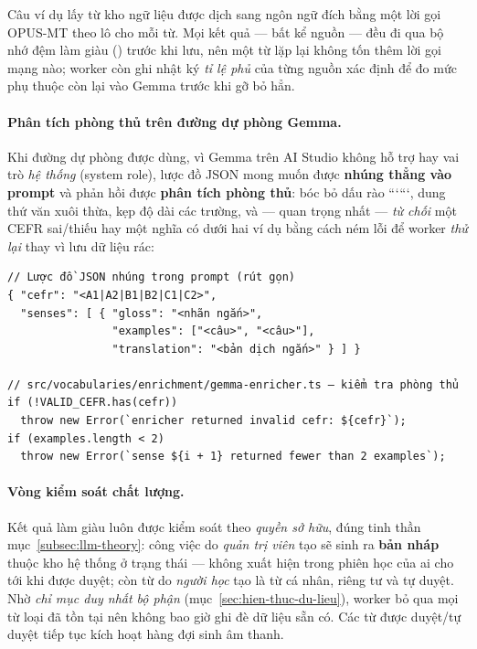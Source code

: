 Câu ví dụ lấy từ kho ngữ liệu được dịch sang ngôn ngữ đích bằng một lời gọi
OPUS-MT theo lô cho mỗi từ. Mọi kết quả --- bất kể nguồn --- đều đi qua bộ nhớ
đệm làm giàu () trước khi lưu, nên một từ lặp lại không
tốn thêm lời gọi mạng nào; worker còn ghi nhật ký \textit{tỉ lệ phủ} của từng
nguồn xác định để đo mức phụ thuộc còn lại vào Gemma trước khi gỡ bỏ hẳn.

\paragraph{Phân tích phòng thủ trên đường dự phòng Gemma.} Khi đường dự phòng
được dùng, vì Gemma trên AI Studio không hỗ trợ  hay vai
trò \textit{hệ thống} (system role), lược đồ JSON mong muốn được \textbf{nhúng
thẳng vào prompt} và phản hồi được \textbf{phân tích phòng thủ}: bóc bỏ dấu rào
``````, dung thứ văn xuôi thừa, kẹp độ dài các trường, và ---
quan trọng nhất --- \textit{từ chối} một CEFR sai/thiếu hay một nghĩa có dưới
hai ví dụ bằng cách ném lỗi để worker \textit{thử lại} thay vì lưu dữ liệu rác:

\begin{verbatim}
// Lược đồ JSON nhúng trong prompt (rút gọn)
{ "cefr": "<A1|A2|B1|B2|C1|C2>",
  "senses": [ { "gloss": "<nhãn ngắn>",
                "examples": ["<câu>", "<câu>"],
                "translation": "<bản dịch ngắn>" } ] }

// src/vocabularies/enrichment/gemma-enricher.ts — kiểm tra phòng thủ
if (!VALID_CEFR.has(cefr))
  throw new Error(`enricher returned invalid cefr: ${cefr}`);
if (examples.length < 2)
  throw new Error(`sense ${i + 1} returned fewer than 2 examples`);
\end{verbatim}

\paragraph{Vòng kiểm soát chất lượng.} Kết quả làm giàu luôn được kiểm soát theo
\textit{quyền sở hữu}, đúng tinh thần mục~\ref{subsec:llm-theory}: công việc do
\textit{quản trị viên} tạo sẽ sinh ra \textbf{bản nháp} thuộc kho hệ thống ở
trạng thái  --- không xuất hiện trong phiên học của
ai cho tới khi được duyệt; còn từ do \textit{người học} tạo là từ cá nhân,
riêng tư và tự duyệt. Nhờ \textit{chỉ mục duy nhất bộ phận}
(mục~\ref{sec:hien-thuc-du-lieu}), worker bỏ qua mọi từ loại đã tồn tại nên
không bao giờ ghi đè dữ liệu sẵn có. Các từ được duyệt/tự duyệt tiếp tục kích
hoạt hàng đợi sinh âm thanh.

